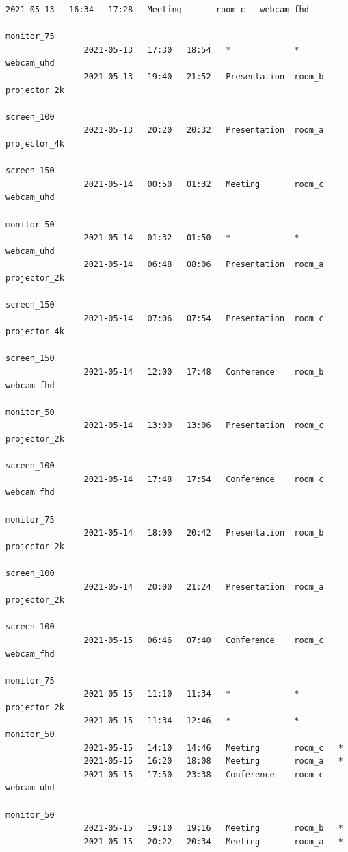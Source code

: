 \documentclass{article}
\begin{document}
\begin{Verbatim}[gobble=8]
                2021-05-13   16:34   17:28   Meeting       room_c   webcam_fhd
                                                                    monitor_75
                2021-05-13   17:30   18:54   *             *        webcam_uhd
                2021-05-13   19:40   21:52   Presentation  room_b   projector_2k
                                                                    screen_100
                2021-05-13   20:20   20:32   Presentation  room_a   projector_4k
                                                                    screen_150
                2021-05-14   00:50   01:32   Meeting       room_c   webcam_uhd
                                                                    monitor_50
                2021-05-14   01:32   01:50   *             *        webcam_uhd
                2021-05-14   06:48   08:06   Presentation  room_a   projector_2k
                                                                    screen_150
                2021-05-14   07:06   07:54   Presentation  room_c   projector_4k
                                                                    screen_150
                2021-05-14   12:00   17:48   Conference    room_b   webcam_fhd
                                                                    monitor_50
                2021-05-14   13:00   13:06   Presentation  room_c   projector_2k
                                                                    screen_100
                2021-05-14   17:48   17:54   Conference    room_c   webcam_fhd
                                                                    monitor_75
                2021-05-14   18:00   20:42   Presentation  room_b   projector_2k
                                                                    screen_100
                2021-05-14   20:00   21:24   Presentation  room_a   projector_2k
                                                                    screen_100
                2021-05-15   06:46   07:40   Conference    room_c   webcam_fhd
                                                                    monitor_75
                2021-05-15   11:10   11:34   *             *        projector_2k
                2021-05-15   11:34   12:46   *             *        monitor_50
                2021-05-15   14:10   14:46   Meeting       room_c   *
                2021-05-15   16:20   18:08   Meeting       room_a   *
                2021-05-15   17:50   23:38   Conference    room_c   webcam_uhd
                                                                    monitor_50
                2021-05-15   19:10   19:16   Meeting       room_b   *
                2021-05-15   20:22   20:34   Meeting       room_a   *

\end{Verbatim}
\end{document}
